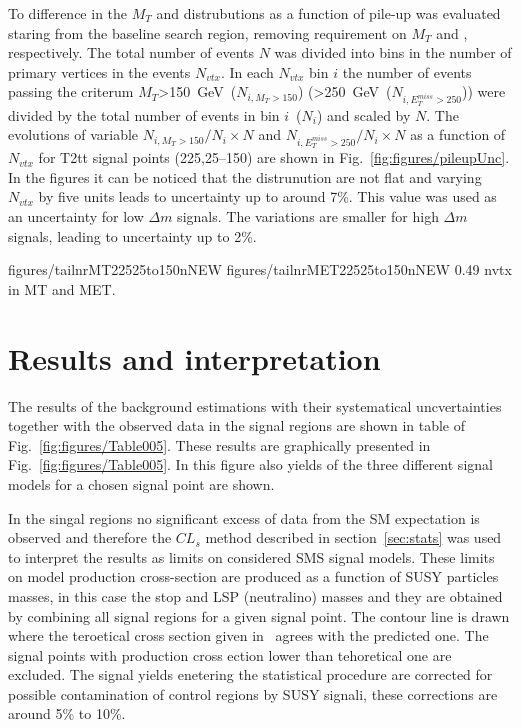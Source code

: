 To difference in the $M_{T}$ and \MET distrubutions as a function of pile-up was evaluated staring from the baseline search region, removing requirement on $M_{T}$ and \MET, respectively. The total number of events $N$ was divided into bins in the number of primary vertices in the events $N_{vtx}$. In each $N_{vtx}$ bin $i$ the number of events passing the criterum $M_{T}$>150~GeV~($N_{i,M_{T}>150}$) (\MET>250~GeV~($N_{i,E_{T}^{miss}>250}$)) were divided by the total number of events in bin $i$~($N_{i}$) and scaled by $N$. The evolutions of variable $N_{i,M_{T}>150}/N_{i} \times N$ and $N_{i,E_{T}^{miss}>250}/N_{i} \times N$ as a function of $N_{vtx}$ for T2tt signal points (225,25--150) are shown in Fig.~\ref{fig:figures/pileupUnc}. In the figures it can be noticed that  the distrunution are not flat and varying $N_{vtx}$ by five units leads to uncertainty up to around 7\%. This value was used as an uncertainty for low $\Delta m$ signals. The variations are smaller for high $\Delta m$ signals, leading to uncertainty up to 2\%.

                 {figures/tailnrMT22525to150nNEW} %
                 {figures/tailnrMET22525to150nNEW} %
                 {0.49}       %
                 { nvtx in MT and MET. }
\newpage
\section{Results and interpretation}

The results of the background estimations with their systematical uncvertainties together with the observed data in the signal regions are shown in table of Fig.~\ref{fig:figures/Table005}. These results are graphically presented in Fig.~\ref{fig:figures/Table005}. In this figure also yields of the three different signal models for a chosen signal point are shown. 

In the singal regions no significant excess of data from the SM expectation is observed and therefore the $CL_{s}$ method described in section~\ref{sec:stats} was used to interpret the results as limits on considered SMS signal models. These limits on model production cross-section are produced as a function of SUSY particles masses, in this case the stop and LSP (neutralino) masses and they are obtained by combining all signal regions for a given signal point. The contour line is drawn where the teroetical cross section given in~\cite{Borschensky:2014cia} agrees with the predicted one. The signal points with production cross ection lower than tehoretical one are excluded. The signal yields enetering the statistical procedure are corrected for possible contamination of control regions by SUSY signali, these corrections are around 5\% to 10\%.

